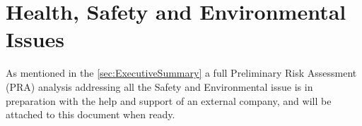 \section{Health, Safety and Environmental Issues}
\label{sec:HealthSafetyEnvironmentalIssues}


As mentioned in the \ref{sec:ExecutiveSummary} a full Preliminary Risk Assessment (PRA) analysis addressing all the Safety and Environmental issue is in preparation with the help and support of an external company, and will be attached to this document  when ready.